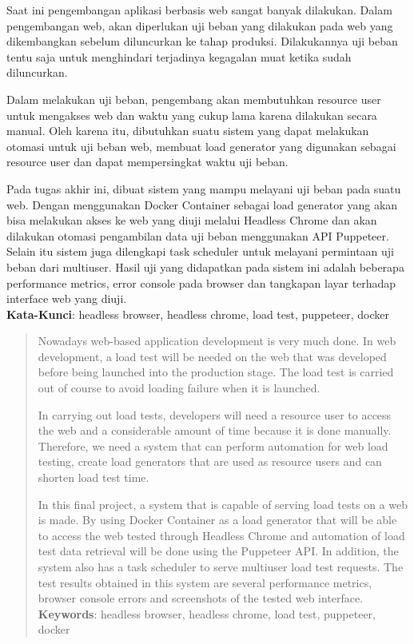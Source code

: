 \begin{abstrak}
		Saat ini pengembangan aplikasi berbasis web sangat banyak dilakukan. Dalam pengembangan web, akan diperlukan uji beban yang dilakukan pada web yang dikembangkan sebelum diluncurkan ke tahap produksi. Dilakukannya uji beban tentu saja untuk menghindari terjadinya kegagalan muat ketika sudah diluncurkan.

		\indent Dalam melakukan uji beban, pengembang akan membutuhkan resource user untuk mengakses web dan waktu yang cukup lama karena dilakukan secara manual. Oleh karena itu, dibutuhkan suatu sistem yang dapat melakukan otomasi untuk uji beban web, membuat load generator yang digunakan sebagai resource user dan dapat mempersingkat waktu uji beban.
		
		\indent Pada tugas akhir ini, dibuat sistem yang mampu melayani uji beban pada suatu web. Dengan menggunakan Docker Container sebagai load generator yang akan bisa melakukan akses ke web yang diuji melalui Headless Chrome dan akan dilakukan otomasi pengambilan data uji beban menggunakan API Puppeteer. Selain itu sistem juga dilengkapi task scheduler untuk melayani permintaan uji beban dari multiuser. Hasil uji yang didapatkan pada sistem ini adalah beberapa performance metrics, error console pada browser dan tangkapan layar terhadap interface web yang diuji. \\

	\noindent \textbf{Kata-Kunci}: headless browser, headless chrome, load test, puppeteer, docker
\end{abstrak}
\newpage
\begin{abstract}
		Nowadays web-based application development is very much done. In web development, a load test will be needed on the web that was developed before being launched into the production stage. The load test is carried out of course to avoid loading failure when it is launched.
		
		\indent In carrying out load tests, developers will need a resource user to access the web and a considerable amount of time because it is done manually. Therefore, we need a system that can perform automation for web load testing, create load generators that are used as resource users and can shorten load test time.
		
		\indent In this final project, a system that is capable of serving load tests on a web is made. By using Docker Container as a load generator that will be able to access the web tested through Headless Chrome and automation of load test data retrieval will be done using the Puppeteer API. In addition, the system also has a task scheduler to serve multiuser load test requests. The test results obtained in this system are several performance metrics, browser console errors and screenshots of the tested web interface. \\

	\noindent \textbf{Keywords}: headless browser, headless chrome, load test, puppeteer, docker
\end{abstract}